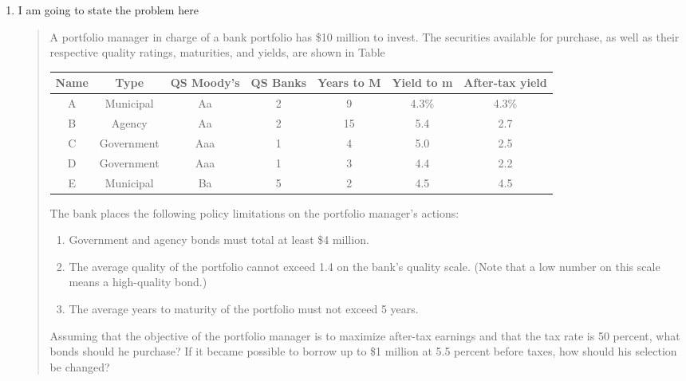 \documentclass[11pt]{article}
\begin{document}
\begin{enumerate}
\begin{tabular}{l|l|l|l}
\end{tabular}

\item I am going to state the problem here
\begin{quote}
A portfolio manager in charge of a bank portfolio has \$10 million to invest. The
securities available for purchase, as well as their respective quality ratings, maturities, and yields, are shown
in Table

\begin{tabular}{c|c|c|c|c|c|c}
Name & Type & QS Moody's & QS Banks& Years to M & Yield to m& After-tax yield\\\hline
A& Municipal& Aa &2& 9& 4.3\% &4.3\%\\
B& Agency& Aa& 2& 15& 5.4& 2.7\\
C& Government& Aaa &1 &4 &5.0 &2.5\\
D &Government &Aaa& 1& 3& 4.4& 2.2\\
E& Municipal &Ba &5 &2 &4.5 &4.5
\end{tabular}

The bank places the following policy limitations on the portfolio manager’s actions:
\begin{enumerate}
\item Government and agency bonds must total at least \$4 million.
\item  The average quality of the portfolio cannot exceed 1.4 on the bank’s quality scale. (Note that a low
number on this scale means a high-quality bond.)
\item  The average years to maturity of the portfolio must not exceed 5 years.
\end{enumerate}
Assuming that the objective of the portfolio manager is to maximize after-tax earnings and that the tax rate is 50 percent, what bonds should he purchase? If it became possible to borrow up to \$1 million at 5.5 percent before taxes, how should his selection be changed?
\end{quote}

\end{enumerate}
\end{document}
